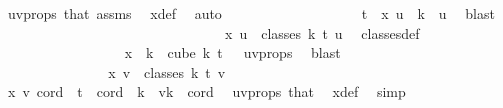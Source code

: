 \begin{isabellebody}
\ uv{\isacharunderscore}{\kern0pt}props\ that\ assms{\isacharparenleft}{\kern0pt}{}{\isacharparenright}{\kern0pt}\ \isamarkupfalse%
\ x{\isacharunderscore}{\kern0pt}def\ \isamarkupfalse%
\ auto\isanewline
\ \ \ \ \ \ \ \ \ \ \ \ \ \ \ \ \isamarkupfalse%
\ \isamarkupfalse%
\ {\isachardoublequoteopen}t\ {\isasymnotin}\ x\ u\ {\isacharbackquote}{\kern0pt}\ {\isacharbraceleft}{\kern0pt}{\isachardot}{\kern0pt}{\isachardot}{\kern0pt}{\isacharless}{\kern0pt}k\ {\isacharminus}{\kern0pt}\ u{\isacharbraceright}{\kern0pt}{\isachardoublequoteclose}\ \isamarkupfalse%
\ blast\isanewline
\ \ \ \ \ \ \ \ \ \ \ \ \ \ \isacommand{{\isacharbraceright}{\kern0pt}}\isamarkupfalse%
\isanewline
\ \ \ \ \ \ \ \ \ \ \ \ \ \ \isamarkupfalse%
\ \isamarkupfalse%
\ {\isachardoublequoteopen}x\ u\ {\isasymin}\ classes\ k\ t\ u{\isachardoublequoteclose}\ \isamarkupfalse%
\ classes{\isacharunderscore}{\kern0pt}def\ \isanewline
\ \ \ \ \ \ \ \ \ \ \ \ \ \ \ \ \isamarkupfalse%
\ {\isacartoucheopen}x\ {\isacharbackquote}{\kern0pt}\ {\isacharbraceleft}{\kern0pt}{\isachardot}{\kern0pt}{\isachardot}{\kern0pt}k{\isacharbraceright}{\kern0pt}\ {\isasymsubseteq}\ cube\ k\ {\isacharparenleft}{\kern0pt}t\ {\isacharplus}{\kern0pt}\ {}{\isacharparenright}{\kern0pt}{\isacartoucheclose}\ uv{\isacharunderscore}{\kern0pt}props\ \isamarkupfalse%
\ blast\isanewline
\ \ \ \ \ \ \ \ \ \ \ \ \isamarkupfalse%
\isanewline
\ \ \ \ \ \ \ \ \ \ \ \ \isamarkupfalse%
\ \isamarkupfalse%
\ {\isachardoublequoteopen}x\ v\ {\isasymin}\ classes\ k\ t\ v{\isachardoublequoteclose}\isanewline
\ \ \ \ \ \ \ \ \ \ \ \ \isamarkupfalse%
\ {\isacharminus}{\kern0pt}\isanewline
\ \ \ \ \ \ \ \ \ \ \ \ \ \ \isamarkupfalse%
\ {\isachardoublequoteopen}x\ v\ cord\ {\isacharequal}{\kern0pt}\ t{\isachardoublequoteclose}\ \ {\isachardoublequoteopen}cord\ {\isasymin}\ {\isacharbraceleft}{\kern0pt}k\ {\isacharminus}{\kern0pt}\ v{\isachardot}{\kern0pt}{\isachardot}{\kern0pt}{\isacharless}{\kern0pt}k{\isacharbraceright}{\kern0pt}{\isachardoublequoteclose}\ \ cord\ \isamarkupfalse%
\ uv{\isacharunderscore}{\kern0pt}props\ that\ \isamarkupfalse%
\ x{\isacharunderscore}{\kern0pt}def\ \isamarkupfalse%
\ simp\ \isanewline
\ \ \ \ \ \ \ \ \ \ \ \ \ \ \isamarkupfalse%

\end{isabellebody}
